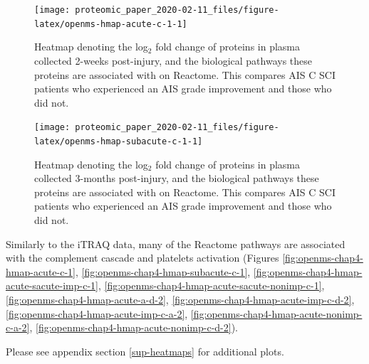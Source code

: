 \documentclass[9pt,lineno]{elife}
\begin{document}
\clearpage
\begin{landscape}



\begin{figure}

{\centering \texttt{[image: proteomic\_paper\_2020-02-11\_files/figure-latex/openms-hmap-acute-c-1-1]} 

}

\caption{Heatmap denoting the log\(_2\) fold change of proteins in plasma collected 2-weeks post-injury, and the biological pathways these proteins are associated with on Reactome. This compares AIS C SCI patients who experienced an AIS grade improvement and those who did not.}\label{fig:openms-hmap-acute-c-1}
\end{figure}

\end{landscape}
\begin{landscape}



\begin{figure}

{\centering \texttt{[image: proteomic\_paper\_2020-02-11\_files/figure-latex/openms-hmap-subacute-c-1-1]} 

}

\caption{Heatmap denoting the log\(_2\) fold change of proteins in plasma collected 3-months post-injury, and the biological pathways these proteins are associated with on Reactome. This compares AIS C SCI patients who experienced an AIS grade improvement and those who did not.}\label{fig:openms-hmap-subacute-c-1}
\end{figure}

\end{landscape}
\clearpage

Similarly to the iTRAQ data, many of the Reactome pathways are associated with the complement cascade and platelets activation (Figures \ref{fig:openms-chap4-hmap-acute-c-1}, \ref{fig:openms-chap4-hmap-subacute-c-1}, \ref{fig:openms-chap4-hmap-acute-sacute-imp-c-1}, \ref{fig:openms-chap4-hmap-acute-sacute-nonimp-c-1}, \ref{fig:openms-chap4-hmap-acute-a-d-2}, \ref{fig:openms-chap4-hmap-acute-imp-c-d-2}, \ref{fig:openms-chap4-hmap-acute-imp-c-a-2}, \ref{fig:openms-chap4-hmap-acute-nonimp-c-a-2}, \ref{fig:openms-chap4-hmap-acute-nonimp-c-d-2}).

Please see appendix section \ref{sup-heatmaps} for additional plots.
\end{document}
